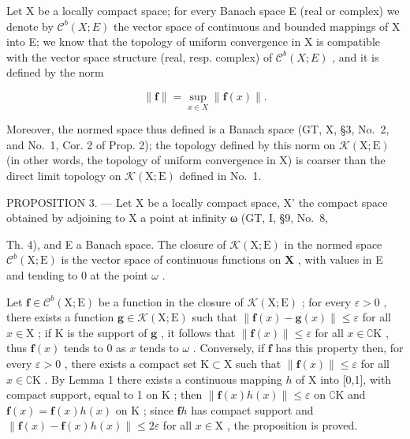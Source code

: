 Let X be a locally compact space; for every Banach space E (real or complex) we denote by \(\mathcal{C}^{b}(X;E)\) the vector space of continuous and bounded mappings of X into E; we know that the topology of uniform convergence in X is compatible with the vector space structure (real, resp. complex) of \(\mathcal{C}^{b}(X;E)\) , and it is defined by the norm

\[
\| \mathbf {f} \| = \sup _ {x \in X} \| \mathbf {f} (x) \|.\tag{3}
\]

Moreover, the normed space thus defined is a Banach space (GT, X, §3, No.~2, and No.~1, Cor. 2 of Prop. 2); the topology defined by this norm on \(\mathcal{K}(\mathrm{X};\mathrm{E})\) (in other words, the topology of uniform convergence in X) is coarser than the direct limit topology on \(\mathcal{K}(\mathrm{X};\mathrm{E})\) defined in No.~1.

PROPOSITION 3. --- Let X be a locally compact space, X' the compact space obtained by adjoining to X a point at infinity ω (GT, I, §9, No.~8,

Th. 4), and E a Banach space. The closure of \(\mathcal{K}(\mathrm{X};\mathrm{E})\) in the normed space \(\mathcal{C}^b (\mathrm{X};\mathrm{E})\) is the vector space of continuous functions on \(\mathbf{X}\) , with values in E and tending to 0 at the point \(\omega\) .

Let \(\mathbf{f} \in \mathcal{C}^b(\mathrm{X};\mathrm{E})\) be a function in the closure of \(\mathcal{K}(\mathrm{X};\mathrm{E})\) ; for every \(\varepsilon > 0\) , there exists a function \(\mathbf{g} \in \mathcal{K}(\mathrm{X};\mathrm{E})\) such that \(\| \mathbf{f}(x) - \mathbf{g}(x) \| \leqslant \varepsilon\) for all \(x \in \mathrm{X}\) ; if \(\mathrm{K}\) is the support of \(\mathbf{g}\) , it follows that \(\| \mathbf{f}(x) \| \leqslant \varepsilon\) for all \(x \in \complement \mathrm{K}\) , thus \(\mathbf{f}(x)\) tends to 0 as \(x\) tends to \(\omega\) . Conversely, if \(\mathbf{f}\) has this property then, for every \(\varepsilon > 0\) , there exists a compact set \(\mathrm{K} \subset \mathrm{X}\) such that \(\| \mathbf{f}(x) \| \leqslant \varepsilon\) for all \(x \in \complement \mathrm{K}\) . By Lemma 1 there exists a continuous mapping \(h\) of X into {[}0,1{]}, with compact support, equal to 1 on \(\mathrm{K}\) ; then \(\| \mathbf{f}(x) h(x) \| \leqslant \varepsilon\) on \(\complement \mathrm{K}\) and \(\mathbf{f}(x) = \mathbf{f}(x) h(x)\) on \(\mathrm{K}\) ; since \(\mathbf{f}h\) has compact support and \(\| \mathbf{f}(x) - \mathbf{f}(x) h(x) \| \leqslant 2\varepsilon\) for all \(x \in \mathrm{X}\) , the proposition is proved.

